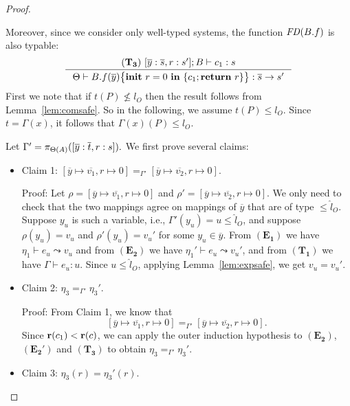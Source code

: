 {{{\begin{proof}
\begin{ProofEnumDesc}
Moreover, since we consider only well-typed systems,
the function $\FD(B.f)$ is also typable:
$$
\inference
    {
      (\mathbf{T_3}) ~ [\overline{y}:\overline{s}, r : s']; B\vdash c_1 : s
    }
    {
      \Theta \vdash \lpFUN{B.f}{\overline{y}}{c_1} :
      \overline{s}\rightarrow s'
    }
$$
First we note that if $t(P) \nleq l_O$ then the result
follows from Lemma~\ref{lem:comsafe}.
So in the following, we assume $t(P) \leq l_O$.
Since $t = \Gamma(x)$, it follows that
$\Gamma(x)(P) \leq l_O.$

Let $\Gamma' = \app{[\overline{y} : \overline{t}, r : s]}{\Theta(A)}.$
We first prove several claims:
\begin{itemize}
\item Claim 1:
$[\overline{y} \mapsto \overline{v_1}, r \mapsto 0]
=_{\Gamma'} [\overline{y} \mapsto \overline{v_2}, r\mapsto 0].$

Proof:
Let $\rho = [\overline{y} \mapsto \overline{v_1}, r \mapsto 0]$
and $\rho' = [\overline{y} \mapsto \overline{v_2}, r \mapsto 0]$.
We only need to check that the two mappings
agree on mappings of $\overline{y}$ that are of type $\leq \hat{l}_O.$
Suppose $y_u$ is such a variable, i.e., $\Gamma'(y_u) = u \leq \hat{l}_O$,
and suppose $\rho(y_u) = v_u$ and
$\rho'(y_u) = v_u'$ for some $y_u \in \overline{y}.$
From $(\mathbf{E_1})$ we have
$\eta_1 \vdash e_u \leadsto v_u$
and from $(\mathbf{E_2})$
we have $\eta_1' \vdash e_u \leadsto v_u'$,
and from $(\mathbf{T_1})$ we have $\Gamma \vdash e_u : u.$
Since $u \leq \hat{l}_O$, applying Lemma~\ref{lem:expsafe},
we get $v_u = v_u'$.


\item Claim 2: $\eta_3 =_{\Gamma'} \eta_3'.$

Proof: From Claim 1, we know that
$$[\overline{y} \mapsto \overline{v_1}, r \mapsto 0]
=_{\Gamma'} [\overline{y} \mapsto \overline{v_2}, r \mapsto 0].$$
Since $\rank{c_1}<\rank{c}$, we can apply the outer induction
hypothesis to $(\mathbf{E_2})$, $(\mathbf{E_2'})$
and $(\mathbf{T_3})$ to obtain
$\eta_3 =_{\Gamma'} \eta_3'.$

\item Claim 3: $\eta_3(r) = \eta_3'(r).$


\end{itemize}
\end{ProofEnumDesc}
\end{proof}}}}
